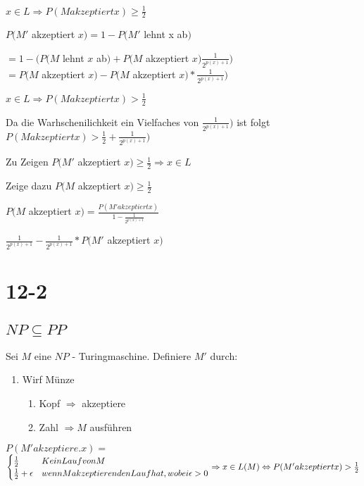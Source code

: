 \documentclass[12pt, oneside, a4paper, numbers=enddot, abstracton, parskip=full]{scrreprt}
\begin{document}
\begin{enumerate}
\begin{enumerate}
$x \in L \Rightarrow P (M akzeptiert x) \geq \frac{1}{2}$


  $P(M'$ akzeptiert $x) = 1 - P(M'$ lehnt x ab$)$

$= 1 - (P(M$ lehnt $x$ ab$) + P(M$ akzeptiert $x) \frac{1}{2^{p(x)+1}})$ \\
$= P(M$ akzeptiert $x) - P(M$ akzeptiert $x) * \frac{1}{2^{p(x)+1}}) $

$x \in L \Rightarrow P(M akzeptiert x) > \frac{1}{2}$

Da die Warhschenilichkeit ein Vielfaches von $\frac{1}{2^{p(x)+1}})$ ist folgt
$P(M akzeptiert x) > \frac{1}{2} + \frac{1}{2^{p(x)+1}})$

Zu Zeigen $P(M'$ akzeptiert $x) \geq \frac{1}{2} \Rightarrow x \in L$

Zeige dazu $P(M$ akzeptiert $x) \geq \frac{1}{2}$

$P(M$ akzeptiert $x) = \frac{P(M' akzeptiert x)}{1-\frac{1}{2^{p(x)+1}}} $

$ \frac{1}{2^{p(x)+1}} - \frac{1}{2^{p(x)+1}} * P(M'$ akzeptiert $x)$

\section{12-2}
\label{sec:12-2}

\subsection{$NP \subseteq PP$}
Sei $M$ eine $NP$ - Turingmaschine. Definiere $M'$ durch:
\begin{enumerate}
\item Wirf Münze
  \begin{enumerate}
  \item Kopf $\Rightarrow$ akzeptiere
  \item Zahl $\Rightarrow M$  ausführen
  \end{enumerate}
\end{enumerate}

$P(M' akzeptiere. x) = $
\begin{math}
  \begin{cases}
    \frac{1}{2} & Kein\- Lauf von M \\
    \frac{1}{2} + \epsilon & wenn M akzeptierenden Lauf hat, wobei \epsilon > 0
  \end{cases}

  \Rightarrow x \in L(M) \Leftrightarrow P(M' akzeptiert x) > \frac{1}{2}
\end{math}


\end{enumerate}
\end{enumerate}
\end{document}
